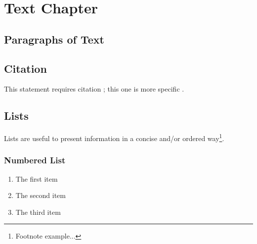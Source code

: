 	
	
	
	
	\chapter{Text Chapter}
	
	\section{Paragraphs of Text}
	
	\lipsum[1-7] %
	
	
	\section{Citation}
	
	This statement requires citation \cite{book_key}; this one is more specific \cite[122]{article_key}.
	
	
	\section{Lists}
	
	Lists are useful to present information in a concise and/or ordered way\footnote{Footnote example...}.
	
	\subsection{Numbered List}
	
	\begin{enumerate}
		\item The first item
		\item The second item
		\item The third item
	\end{enumerate}
	
